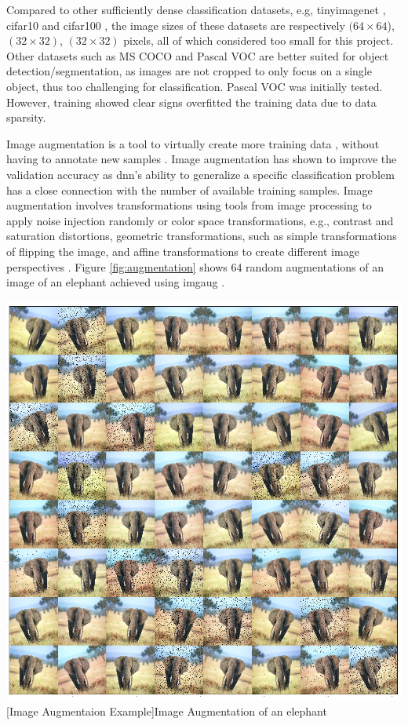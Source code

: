 \begin{enumdescript}
\begin{enumdescript}
		Compared to other sufficiently dense classification datasets, e.g, \gls{tinyimagenet} \cite{li_cs231n:_2018}, \gls{cifar10} and \gls{cifar100} \cite{krizhevsky_cifar-10_nodate}, the image sizes of these datasets are respectively $(64\times 64$), $(32\times 32)$, $(32\times 32)$ pixels, all of which considered too small for this project. Other datasets such as MS COCO and Pascal VOC are better suited for object detection/segmentation, as images are not cropped to only focus on a single object, thus too challenging for classification. Pascal VOC was initially tested. However, training showed clear signs overfitted the training data due to data sparsity. 
		
		\item[Image Augmentation] Image augmentation is a tool to virtually create more training data \cite{perez_effectiveness_2017}, without having to annotate new samples \cite{goodfellow_deep_2016}. Image augmentation has shown to improve the validation accuracy as \gls{dnn}'s ability to generalize a specific classification problem has a close connection with the number of available training samples.
		Image augmentation involves transformations using tools from image processing to apply noise injection randomly or color space transformations, e.g., contrast and saturation distortions, geometric transformations, such as simple transformations of flipping the image, and affine transformations to create different image perspectives \cite{shorten_survey_2019}. Figure \ref{fig:augmentation} shows 64 random augmentations of an image of an elephant achieved using \gls{imgaug} \cite{jung_imgaug:_nodate}.  
		
		\begin{minipage}[t]{\linewidth}
			\centering
			\includegraphics[width=.7\linewidth]{figures/augmentation/augmentation_high_resolution.png}
			[Image Augmentaion Example]{Image Augmentation of an elephant}
			\label{fig:augmentation}
		\end{minipage}
		

\end{enumdescript}
\end{enumdescript}
